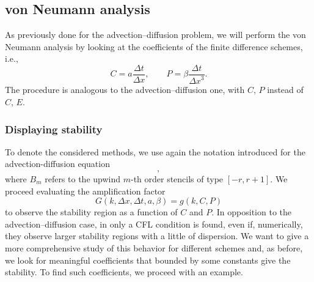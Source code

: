 \subsection{von Neumann analysis}
As previously done for the advection--diffusion problem, we will perform the von Neumann analysis by looking at the coefficients of the finite difference schemes, i.e.,
$$C=a\frac{\Delta t}{\Delta x},\qquad P= \beta\frac{\Delta t}{{\Delta x}^3}.$$
The procedure is analogous to the advection--diffusion one, with $C,\,P$ instead of $C,\,E$.
\subsubsection{Displaying stability}
To denote the considered methods, we use again the notation introduced for the advection-diffusion equation
	\begin{equation*}
[\TMM,\NODES,N, A_n,B_m],
\end{equation*}
where $B_m$ refers to the upwind $m$-th order stencils of type $[-r,r+1]$.
We proceed evaluating the amplification factor 
\begin{equation*}
G(k,\Delta x, \Delta t, a, \beta)=g(k,C,P)
\end{equation*}
to observe the stability region as a function of $C$ and $P$. 
In opposition to the advection--diffusion case, in \cite{TanChenShu_ImEx_Stability} only a CFL condition is found, even if, numerically, they observe larger stability regions with a little of dispersion.
We want to give a more comprehensive study of this behavior for different schemes and, as before, we look for meaningful coefficients that bounded by some constants give the stability. 
To find such coefficients, we proceed with an example.
